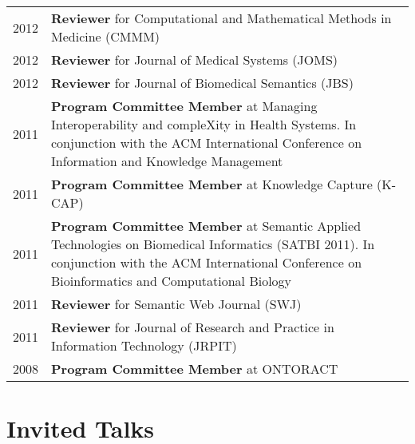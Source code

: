 \documentclass[11pt,fullpage]{article}
\begin{document}
\begin{longtable}{p{0.5in}|p{5.5in}}
2012  & \textbf{Reviewer} for Computational and Mathematical Methods in Medicine (CMMM) \\
2012  & \textbf{Reviewer} for Journal of Medical Systems (JOMS) \\
2012  & \textbf{Reviewer} for Journal of Biomedical Semantics (JBS) \\
2011 & \textbf{Program Committee Member} at Managing Interoperability and compleXity in Health Systems. In conjunction with the ACM International Conference on Information and Knowledge Management\\
2011 & \textbf{Program Committee Member} at Knowledge Capture (K-CAP)\\
2011 & \textbf{Program Committee Member} at Semantic Applied Technologies on Biomedical Informatics (SATBI 2011). In conjunction with the ACM International Conference on Bioinformatics and Computational Biology\\
2011  & \textbf{Reviewer} for Semantic Web Journal (SWJ) \\
2011  & \textbf{Reviewer} for Journal of Research and Practice in Information Technology (JRPIT)\\
2008 & \textbf{Program Committee Member} at ONTORACT \\

\end{longtable}


\section*{Invited Talks}
\end{document}
